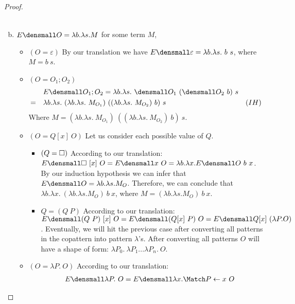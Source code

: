 \begin{proof}
\begin{enumerate}[(a)]
\begin{itemize}
\begin{align*}
                    \end{align*} 
            \end{itemize}
\item $E\den{O} = \lambda b. \lambda s. M$ for some term $M$,
    \begin{itemize}
    \item $(O = \varepsilon)$ By our translation we have $E\den{\varepsilon} = \lambda b. \lambda s. ~b ~s$, where $M= b ~s$.
    \item $(O = O_1;O_2)$
        \begin{align*}
            & \quad E\den{O_1;O_2} = \lambda b. \lambda s. ~\den{O_1} ~(\den{O_2} ~b) ~s\\
            =& \quad \lambda b. \lambda s. ~(\lambda b. \lambda s. ~M_{O_1}) ~((\lambda b. \lambda s. ~M_{O_2}) ~b) ~s & (IH)
        \end{align*}
        Where $M=(\lambda b. \lambda s. ~M_{O_1}) ~((\lambda b. \lambda s. ~M_{O_2}) ~b) ~s$.
    \item $(O = Q[x] ~O)$ Let us consider each possible value of $Q$.
        \begin{itemize}
            \item $(Q=\square)$ According to our translation: $E\den{\hole ~ [x] ~O} = E\den{x ~O} = \lambda b. \lambda x. E\den{O} ~ b ~ x$.
            By our induction hypothesis we can infer that $E\den{O}=\lambda b. \lambda s. M_O$.
            Therefore, we can conclude that $\lambda b. \lambda x. ~(\lambda b. \lambda s. M_O) ~ b ~ x$, where $ M = (\lambda b. \lambda s. M_O) ~ b ~ x$.
            \item $Q=(Q ~P)$ According to our translation: $E\den{(Q ~P) ~ [x] ~O} = E\den{(Q[x] ~P) ~O} = E\den{Q[x] ~ (\lambda P. O)}$.
            Eventually, we will hit the previous case after converting all patterns in the copattern into pattern $\lambda$'s.
            After converting all patterns $O$ will have a shape of form: $\lambda P_0. ~\lambda P_1 ... \lambda P_n. ~O$.
        \end{itemize}
    \item $(O = \lambda P. ~O)$ According to our translation:
        \begin{align*} 
            & \quad E\den{\lambda P. ~O} = E\den{\lambda x. \Match P \gets x ~ O}\\

\end{align*}
\end{itemize}
\end{enumerate}
\end{proof}
